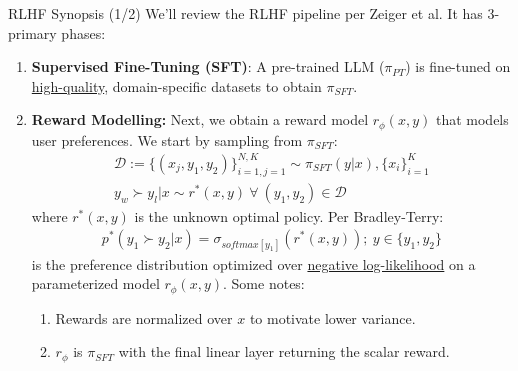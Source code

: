 \documentclass{beamer}
\begin{document}
\begin{frame}{RLHF Synopsis (1/2)}
	We'll review the RLHF pipeline per Zeiger et al. It has 3-primary phases:
	\begin{enumerate}[label=\arabic*.]
		\item \textbf{Supervised Fine-Tuning (SFT)}: A pre-trained LLM ($\pi_{PT}$) is fine-tuned on \underline{high-quality}, domain-specific datasets to obtain $\pi_{SFT}$. \pause
		\item \textbf{Reward Modelling:} Next, we obtain a reward model $r_\phi(x,y)$ that models user preferences. \pause We start by sampling from $\pi_{SFT}$:
			\begin{gather}
				\mathcal{D} := \{(x_j, y_1, y_2)\}^{N,K}_{i=1,j=1} \sim \pi_{SFT}(y|x), \{x_i\}^K_{i=1} \\
				y_w \succ y_l | x \sim r^*(x,y)~\forall~(y_1, y_2) \in \mathcal{D}
			\end{gather}
			where $r^*(x,y)$ is the unknown optimal policy. \pause Per Bradley-Terry:
			\begin{gather}
				p^*(y_1 \succ y_2 | x) = \sigma_{softmax[y_1]}(r^*(x,y));~y \in \{y_1, y_2 \} \label{eq:3}
			\end{gather}
			is the preference distribution optimized over \underline{negative log-likelihood} on a parameterized model $r_\phi(x,y)$. \pause Some notes:
			\begin{enumerate}[label=\alph*.]
				\item Rewards are normalized over $x$ to motivate lower variance. \pause
				\item $r_\phi$ is $\pi_{SFT}$ with the final linear layer returning the scalar reward.
			\end{enumerate}
	\end{enumerate}
\end{frame}
\end{document}
